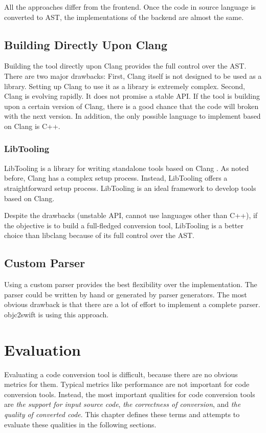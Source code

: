 \documentclass{sfuthesis}
\begin{document}
All the approaches differ from the frontend. Once the code in source language is converted to AST, the implementations of the backend are almost the same.

\section{Building Directly Upon Clang}

Building the tool directly upon Clang provides the full control over the AST. There are two major drawbacks: First, Clang itself is not designed to be used as a library. Setting up Clang to use it as a library is extremely complex. Second, Clang is evolving rapidly. It does not promise a stable API. If the tool is building upon a certain version of Clang, there is a good chance that the code will broken with the next version. In addition, the only possible language to implement based on Clang is C++.

\subsection{LibTooling}

LibTooling is a library for writing standalone tools based on Clang \cite{libtooling}. As noted before, Clang has a complex setup process. Instead, LibTooling offers a straightforward setup process. LibTooling is an ideal framework to develop tools based on Clang.

Despite the drawbacks (unstable API, cannot use languages other than C++), if the objective is to build a full-fledged conversion tool, LibTooling is a better choice than libclang because of its full control over the AST.

\section{Custom Parser}

Using a custom parser provides the best flexibility over the implementation. The parser could be written by hand or generated by parser generators. The most obvious drawback is that there are a lot of effort to implement a complete parser. objc2swift \cite{objc2swift} is using this approach.

\chapter{Evaluation}

Evaluating a code conversion tool is difficult, because there are no obvious metrics for them. Typical metrics like performance are not important for code conversion tools. Instead, the most important qualities for code conversion tools are \emph{the support for input source code}, \emph{the correctness of conversion}, and \emph{the quality of converted code}. This chapter defines these terms and attempts to evaluate these qualities in the following sections.
\end{document}
